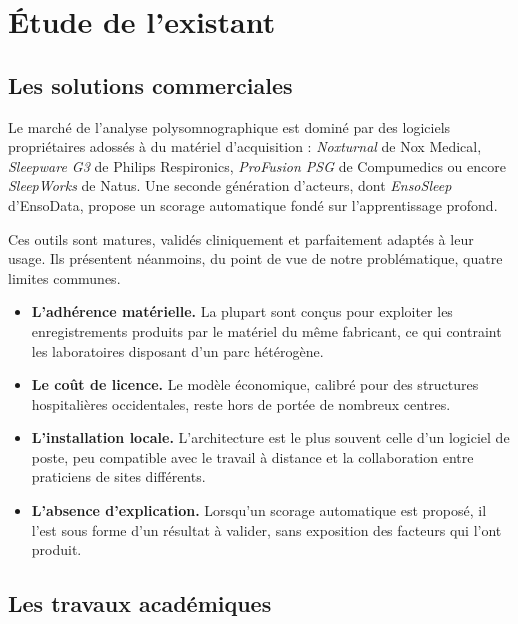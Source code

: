 \section{Étude de l'existant}

\subsection{Les solutions commerciales}

Le marché de l'analyse polysomnographique est dominé par des logiciels propriétaires
adossés à du matériel d'acquisition : \emph{Noxturnal} de Nox Medical, \emph{Sleepware
G3} de Philips Respironics, \emph{ProFusion PSG} de Compumedics ou encore
\emph{SleepWorks} de Natus. Une seconde génération d'acteurs, dont \emph{EnsoSleep}
d'EnsoData, propose un scorage automatique fondé sur l'apprentissage profond.

Ces outils sont matures, validés cliniquement et parfaitement adaptés à leur usage.
Ils présentent néanmoins, du point de vue de notre problématique, quatre limites
communes.

\begin{itemize}[itemsep=2pt,topsep=4pt]
  \item \textbf{L'adhérence matérielle.} La plupart sont conçus pour exploiter les
        enregistrements produits par le matériel du même fabricant, ce qui contraint
        les laboratoires disposant d'un parc hétérogène.
  \item \textbf{Le coût de licence.} Le modèle économique, calibré pour des
        structures hospitalières occidentales, reste hors de portée de nombreux
        centres.
  \item \textbf{L'installation locale.} L'architecture est le plus souvent celle d'un
        logiciel de poste, peu compatible avec le travail à distance et la
        collaboration entre praticiens de sites différents.
  \item \textbf{L'absence d'explication.} Lorsqu'un scorage automatique est proposé,
        il l'est sous forme d'un résultat à valider, sans exposition des facteurs qui
        l'ont produit.
\end{itemize}

\subsection{Les travaux académiques}

